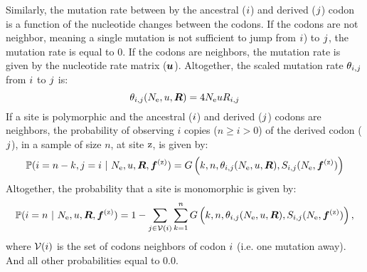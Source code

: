 Similarly, the mutation rate between by the ancestral (${i}$) and derived (${j}$) codon is a function of the nucleotide changes between the codons.
If the codons are not neighbor, meaning a single mutation is not sufficient to jump from ${i}$) to ${j}$, the mutation rate is equal to $0$.
If the codons are neighbors, the mutation rate is given by the nucleotide rate matrix ($\bm{u}$).
Altogether, the scaled mutation rate $\theta_{{i}, {j}}$ from ${i}$ to ${j}$ is:
\begin{equation}
	\theta_{{i}, {j}}(N_{\text{e}}, u, \bm{R}) = 4 N_{\text{e}} u R_{{i}, {j}}
\end{equation}
If a site is polymorphic and the ancestral (${i}$) and derived (${j}$) codons are neighbors, the probability of observing $i$ copies ($n \geq i > 0$) of the derived codon (${j}$), in a sample of size $n$, at site $\text{z}$, is given by:
\begin{equation}
	\mathbb{P} ({i}=n-k,{j}=i \ |\ N_{\text{e}}, u, \bm{R}, \bm{f}^{(\text{z})}) = G\left(k, n, \theta_{{i}, {j}}(N_{\text{e}}, u, \bm{R}), S_{{i}, {j}}(N_{\text{e}}, \bm{f}^{(\text{z})}) \right)
\end{equation}
Altogether, the probability that a site is monomorphic is given by:
\begin{equation}
	\mathbb{P} ({i}= n \ |\ N_{\text{e}}, u, \bm{R}, \bm{f}^{(\text{z})}) = 1 - \sum\limits_{{j} \in \mathcal{V} ({i})} \sum\limits_{k=1}^{n} G\left(k, n, \theta_{{i}, {j}}(N_{\text{e}}, u, \bm{R}), S_{{i}, {j}}(N_{\text{e}}, \bm{f}^{(\text{z})})\right),
\end{equation}
where $ \mathcal{V} ({i})$ is the set of codons neighbors of codon ${i}$ (i.e. one mutation away).
And all other probabilities equal to $0.0$.
